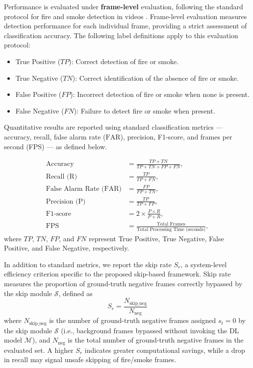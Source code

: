 \documentclass[final,3p,times,twocolumn]{elsarticle}
\begin{document}
Performance is evaluated under \textbf{frame-level} evaluation,
following the standard protocol for fire and smoke detection in videos
\cite{steffens2016non}. Frame-level evaluation measures detection
performance for each individual frame, providing a strict assessment of
classification accuracy. The following label definitions apply to this
evaluation protocol:

\begin{itemize}
\item True Positive ($TP$): Correct detection of fire or smoke.
\item True Negative ($TN$): Correct identification of the absence of
fire or smoke.
\item False Positive ($FP$): Incorrect detection of fire or smoke when
none is present.
\item False Negative ($FN$): Failure to detect fire or smoke when
present.
\end{itemize}

Quantitative results are reported using standard classification metrics
--- accuracy, recall, false alarm rate ($\mathrm{FAR}$), precision,
F1-score, and frames per second (FPS) --- as defined below.

\begin{align}
\text{Accuracy} &= \frac{TP + TN}{TP + TN + FP + FN}, \\
\text{Recall (R)} &= \frac{TP}{TP + FN}, \\
\text{False Alarm Rate (FAR)} &= \frac{FP}{FP + TN}, \\
\text{Precision (P)} &= \frac{TP}{TP + FP}, \\
\text{F1-score} &= 2 \times \frac{P \times R}{P + R}, \\
\text{FPS} &= \frac{\text{Total Frames}}{\text{Total Processing Time (seconds)}},
\end{align}
where $TP$, $TN$, $FP$, and $FN$ represent True Positive, True Negative,
False Positive, and False Negative, respectively.

In addition to standard metrics, we report the skip rate $S_r$, a
system-level efficiency criterion specific to the proposed skip-based
framework. Skip rate measures the proportion of ground-truth negative
frames correctly bypassed by the skip module $\mathcal{S}$, defined as
\begin{equation}
S_r = \frac{N_{\text{skip\_neg}}}{N_{\text{neg}}}
\end{equation}
where $N_{\text{skip\_neg}}$ is the number of ground-truth negative
frames assigned $s_t = 0$ by the skip module $\mathcal{S}$ (i.e.,
background frames bypassed without invoking the DL model $\mathcal{M}$),
and $N_{\text{neg}}$ is the total number of ground-truth negative frames
in the evaluated set. A higher $S_r$ indicates greater computational
savings, while a drop in recall may signal unsafe skipping of
fire/smoke frames.
\end{document}
